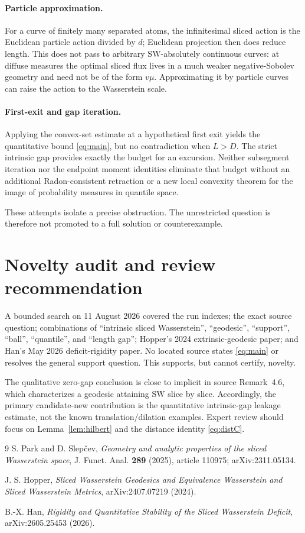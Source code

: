 \documentclass[11pt]{article}
\newcommand{\SW}{\mathrm{SW}}
\begin{document}
\paragraph{Particle approximation.}
For a curve of finitely many separated atoms, the infinitesimal sliced action
is the Euclidean particle action divided by $d$; Euclidean projection then
does reduce length. This does not pass to arbitrary $\SW$-absolutely
continuous curves: at diffuse measures the optimal sliced flux lives in a
much weaker negative-Sobolev geometry and need not be of the form $v\mu$.
Approximating it by particle curves can raise the action to the Wasserstein
scale.

\paragraph{First-exit and gap iteration.}
Applying the convex-set estimate at a hypothetical first exit yields the
quantitative bound \eqref{eq:main}, but no contradiction when $L>D$. The
strict intrinsic gap provides exactly the budget for an excursion. Neither
subsegment iteration nor the endpoint moment identities eliminate that
budget without an additional Radon-consistent retraction or a new local
convexity theorem for the image of probability measures in quantile space.

These attempts isolate a precise obstruction. The unrestricted question is
therefore not promoted to a full solution or counterexample.

\section{Novelty audit and review recommendation}

A bounded search on 11 August 2026 covered the run indexes; the exact source
question; combinations of ``intrinsic sliced Wasserstein'', ``geodesic'',
``support'', ``ball'', ``quantile'', and ``length gap''; Hopper's 2024
extrinsic-geodesic paper; and Han's May 2026 deficit-rigidity paper. No located
source states \eqref{eq:main} or resolves the general support question. This
supports, but cannot certify, novelty.

The qualitative zero-gap conclusion is close to implicit in source
Remark~4.6, which characterizes a geodesic attaining $\SW$ slice by slice.
Accordingly, the primary candidate-new contribution is the quantitative
intrinsic-gap leakage estimate, not the known translation/dilation examples.
Expert review should focus on Lemma~\ref{lem:hilbert} and the distance identity
\eqref{eq:distC}.

\begin{thebibliography}{9}
S. Park and D. Slep\v{c}ev,
\emph{Geometry and analytic properties of the sliced Wasserstein space},
J. Funct. Anal. \textbf{289} (2025), article 110975;
arXiv:2311.05134.

J. S. Hopper,
\emph{Sliced Wasserstein Geodesics and Equivalence Wasserstein and Sliced
Wasserstein Metrics}, arXiv:2407.07219 (2024).

B.-X. Han,
\emph{Rigidity and Quantitative Stability of the Sliced Wasserstein Deficit},
arXiv:2605.25453 (2026).
\end{thebibliography}
\end{document}
